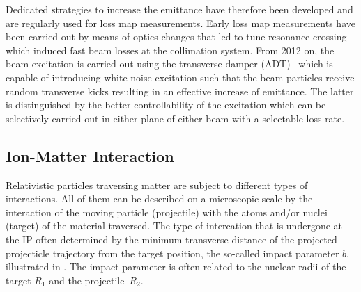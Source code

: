 Dedicated strategies to increase the emittance have therefore been developed and are regularly used for loss map measurements. Early loss map measurements have been carried out by means of optics changes that led to tune resonance crossing which induced fast beam losses at the collimation system. From 2012 on, the beam excitation is carried out using the transverse damper (ADT)~\cite{Sapinski:2013wda} which is capable of introducing white noise excitation such that the beam particles receive random transverse kicks resulting in an effective increase of emittance. The latter is distinguished by the better controllability of the excitation which can be selectively carried out in either plane of either beam with a selectable loss rate. 


\subsection{Ion-Matter Interaction} \label{chap:ionmatterinteraction}
Relativistic particles traversing matter are subject to different types of interactions. All of them can be described on a microscopic scale by the interaction of the moving particle (projectile) with the atoms and/or nuclei (target) of the material traversed. The type of intercation that is undergone at the IP often determined by the minimum transverse distance of the projected projecticle trajectory from the target position, the so-called impact parameter $b$, illustrated in . The impact parameter is often related to the nuclear radii of the target $R_1$ and the \mbox{projectile $R_2$}. 

